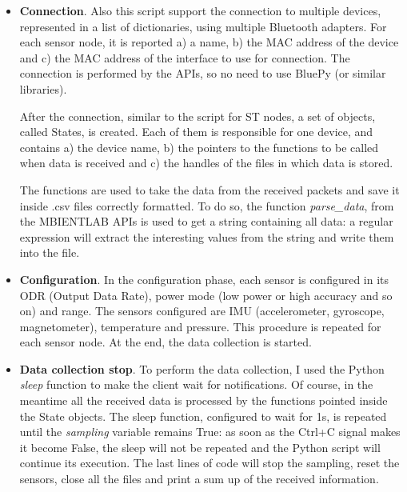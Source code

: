 \begin{itemize} 
    \item \textbf{Connection}. Also this script support the connection to multiple devices, represented in a list of dictionaries, using multiple Bluetooth adapters. For each sensor node, it is reported a) a name, b) the MAC address of the device and c) the MAC address of the interface to use for connection. The connection is performed by the APIs, so no need to use BluePy (or similar libraries). 

    After the connection, similar to the script for ST nodes, a set of objects, called States, is created. Each of them is responsible for one device, and contains a) the device name, b) the pointers to the functions to be called when data is received and c) the handles of the files in which data is stored.

    The functions are used to take the data from the received packets and save it inside .csv files correctly formatted. To do so, the function \textit{parse\_data}, from the MBIENTLAB APIs is used to get a string containing all data: a regular expression will extract the interesting values from the string and write them into the file. 
    \item \textbf{Configuration}. In the configuration phase, each sensor is configured in its ODR (Output Data Rate), power mode (low power or high accuracy and so on) and range. The sensors configured are IMU (accelerometer, gyroscope, magnetometer), temperature and pressure. This procedure is repeated for each sensor node. At the end, the data collection is started.
    \item \textbf{Data collection stop}. To perform the data collection, I used the Python \textit{sleep} function to make the client wait for notifications. Of course, in the meantime all the received data is processed by the functions pointed inside the State objects. The sleep function, configured to wait for 1s, is repeated until the \textit{sampling} variable remains True: as soon as the Ctrl+C signal makes it become False, the sleep will not be repeated and the Python script will continue its execution. The last lines of code will stop the sampling, reset the sensors, close all the files and print a sum up of the received information. 
\end{itemize}
